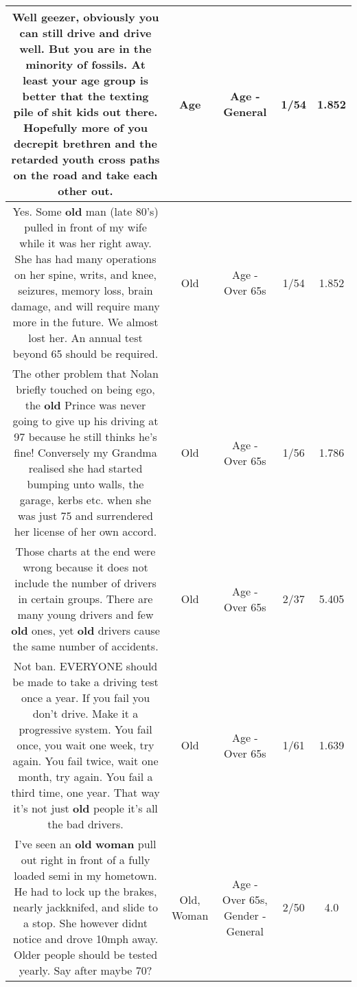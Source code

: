 \documentclass[11pt]{article}
\newlength\mylength
\begin{document}
\begin{center}
\begin{longtable}{|C{.65\mylength}|C{.30\mylength}|C{.12\mylength}|C{.12\mylength}|C{.12\mylength}|}
  \small Well geezer, obviously you can still drive and drive well. But you are in the minority of fossils. At least your \textbf{age} group is better that the texting pile of shit kids out there. Hopefully more of you decrepit brethren and the retarded youth cross paths on the road and take each other out.\normalsize   & Age & Age - General & 1/54 & 1.852 \\  \hline
  \small Yes. Some \textbf{old} man (late 80's) pulled in front of my wife while it was her right away. She has had many operations on her spine, writs, and knee, seizures, memory loss, brain damage, and will require many more in the future. We almost lost her. An annual test beyond 65 should be required.\normalsize   & Old & Age - Over 65s & 1/54 & 1.852 \\  \hline
  \small The other problem that Nolan briefly touched on being ego, the \textbf{old} Prince was never going to give up his driving at 97 because he still thinks he's fine! Conversely my Grandma realised she had started bumping unto walls, the garage, kerbs etc. when she was just 75 and surrendered her license of her own accord.\normalsize   & Old & Age - Over 65s & 1/56 & 1.786 \\  \hline
  \small Those charts at the end were wrong because it does not include the number of drivers in certain groups. There are many young drivers and few \textbf{old} ones, yet \textbf{old} drivers cause the same number of accidents.\normalsize   & Old & Age - Over 65s & 2/37 & 5.405 \\  \hline
  \small Not ban. EVERYONE should be made to take a driving test once a year. If you fail you don't drive. Make it a progressive system. You fail once, you wait one week, try again. You fail twice, wait one month, try again. You fail a third time, one year. That way it's not just \textbf{old} people it's all the bad drivers.\normalsize   & Old & Age - Over 65s & 1/61 & 1.639 \\  \hline
  \small I've seen an \textbf{old} \textbf{woman} pull out right in front of a fully loaded semi in my hometown. He had to lock up the brakes, nearly jackknifed, and slide to a stop. She however didnt notice and drove 10mph away. Older people should be tested yearly. Say after maybe 70?\normalsize   & Old, Woman & Age - Over 65s, Gender - General & 2/50 & 4.0 \\  \hline

\end{longtable}
\end{center}
\end{document}
